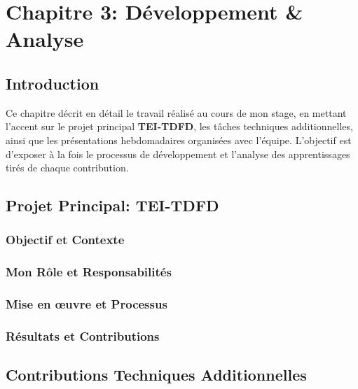 \chapter*{Chapitre 3: Développement \& Analyse}

\section{Introduction}
Ce chapitre décrit en détail le travail réalisé au cours de mon stage, en mettant l'accent sur le projet principal \textbf{TEI-TDFD}, les tâches techniques additionnelles, ainsi que les présentations hebdomadaires organisées avec l'équipe. 
L'objectif est d'exposer à la fois le processus de développement et l'analyse des apprentissages tirés de chaque contribution.

\section{Projet Principal: TEI-TDFD}
\subsection{Objectif et Contexte}

\subsection{Mon Rôle et Responsabilités}

\subsection{Mise en œuvre et Processus}

\subsection{Résultats et Contributions}

\section{Contributions Techniques Additionnelles}
